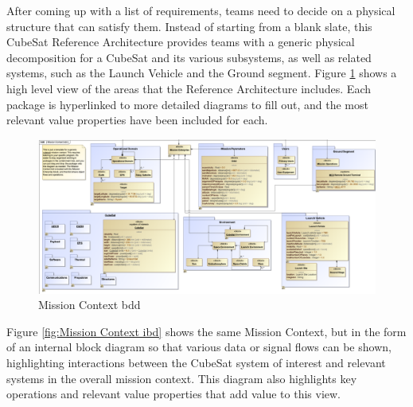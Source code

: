 After coming up with a list of requirements, teams need to decide on a physical structure that can satisfy them. Instead of starting from a blank slate, this CubeSat Reference Architecture provides teams with a generic physical decomposition for a CubeSat and its various subsystems, as well as related systems, such as the Launch Vehicle and the Ground segment. Figure \ref{fig:Mission Context bdd} shows a high level view of the areas that the Reference Architecture includes. Each package is hyperlinked to more detailed diagrams to fill out, and the most relevant value properties have been included for each. 

\begin{figure}[H]
    \centering
    \includegraphics[scale=0.45, angle=90]{Thesis/Analysis_and_Results/Analysis and Results Figures/Mission Context bdd.png}
    \caption{Mission Context bdd}
    \label{fig:Mission Context bdd}
\end{figure}

Figure \ref{fig:Mission Context ibd} shows the same Mission Context, but in the form of an internal block diagram so that various data or signal flows can be shown, highlighting interactions between the CubeSat system of interest and relevant systems in the overall mission context. This diagram also highlights key operations and relevant value properties that add value to this view.

